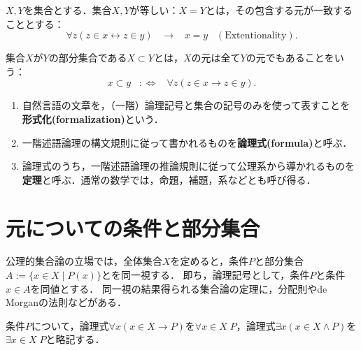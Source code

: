 \documentclass[uplatex,dvipdfmx]{jsreport}
\begin{document}
\begin{axiom}[集合の相等]\label{def-Extentionality}
    $X,Y$を集合とする．集合$X,Y$が等しい：$X=Y$とは，その包含する元が一致することとする：\[\forall z(z\in x\leftrightarrow z\in y)\;\;\;\rightarrow\;\;\; x=y \;\;\;\mathrm{(Extentionality)}.\]
\end{axiom}
\begin{definition}[包含関係]
    集合$X$が$Y$の部分集合である$X\subset Y$とは，$X$の元は全て$Y$の元でもあることをいう：\[x\subset y\;\;\;:\Leftrightarrow\;\;\;\forall z(z\in x\rightarrow z\in y).\]
\end{definition}

\begin{definition}[論理の用語]\mbox{}
    \begin{enumerate}
        \item 自然言語の文章を，（一階）論理記号と集合の記号のみを使って表すことを\textbf{形式化(formalization)}という．
        \item 一階述語論理の構文規則に従って書かれるものを\textbf{論理式(formula)}と呼ぶ．
        \item 論理式のうち，一階述語論理の推論規則に従って公理系から導かれるものを\textbf{定理}と呼ぶ．通常の数学では，命題，補題，系などとも呼び得る．
    \end{enumerate}
\end{definition}

\section{元についての条件と部分集合}

\begin{screen}
    公理的集合論の立場では，全体集合$X$を定めると，条件$P$と部分集合$A:=\{x\in X\mid P(x)\}$とを同一視する．
    即ち，論理記号として，条件$P$と条件$x\in A$を同値とする．
    同一視の結果得られる集合論の定理に，分配則やde Morganの法則などがある．
\end{screen}

\begin{notation}
    条件$P$について，論理式$\forall x(x\in X\rightarrow P)$を$\forall x\in X\;P$，論理式$\exists x(x\in X\land P)$を$\exists x\in X\;P$と略記する．
\end{notation}
\end{document}
